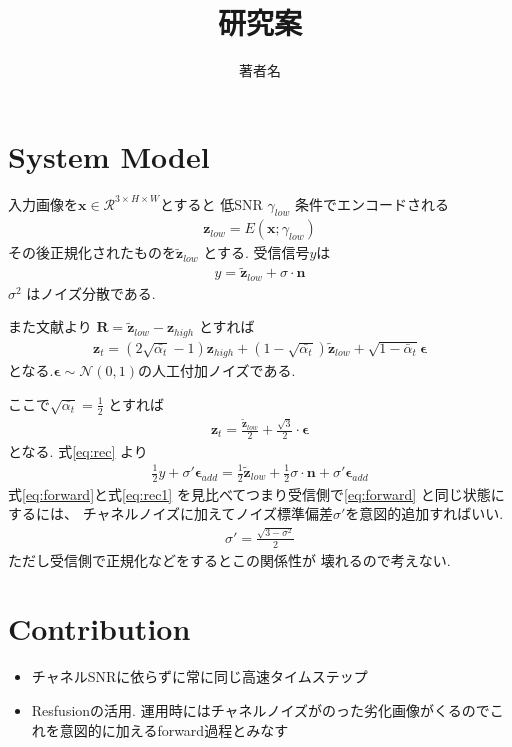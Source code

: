 \documentclass[a4paper,10pt,twocolumn]{ltjsarticle}
\title{
研究案
}
\author{
著者名
}
\date{}
\begin{document}
\maketitle

\section{System Model}

入力画像を$\mathbf{x} \in \mathcal{R}^{3\times H \times W}$とすると
低SNR $\gamma_{low}$ 条件でエンコードされる
\begin{align}
  \bm{z}_{low} = E(\mathbf{x};\gamma_{low})
\end{align}
その後正規化されたものを$\tilde{\bm{z}}_{low}$
とする.
受信信号$y$は
\begin{align}
  y = \tilde{\bm{z}}_{low} + \sigma \cdot \bm{n}
  \label{eq:rec}
\end{align}
$\sigma^2$ はノイズ分散である.

また文献\cite{shi2024resfusion}より
$\bm{R} = \tilde{\bm{z}}_{low} - \bm{z}_{high}$
とすれば
\begin{align}
  \bm{z}_t = (2\sqrt{\bar{\alpha_t}} -  1)\bm{z}_{high} + (1 - \sqrt{\bar{\alpha_t}})\tilde{\bm{z}}_{low} + \sqrt{1 - \bar{\alpha}_t} \bm{\epsilon} 
\end{align}
となる.$\bm{\epsilon} \sim \mathcal{N}(0, 1)$の人工付加ノイズである.

ここで$\sqrt{\bar{\alpha_t}} = \frac{1}{2}$
とすれば
\begin{align}
  \bm{z}_t =  \frac{\tilde{\bm{z}}_{low}}{2} + \frac{\sqrt{3}}{2} \cdot \bm{\epsilon} 
  \label{eq:forward}
\end{align}
となる.
式\eqref{eq:rec}
より
\begin{align}
  \frac{1}{2}y + \sigma'\bm{\epsilon}_{add}  = \frac{1}{2}\tilde{\bm{z}}_{low} + \frac{1}{2}\sigma \cdot \bm{n} +\sigma'\bm{\epsilon}_{add} 
  \label{eq:rec1}
\end{align}
式\eqref{eq:forward}と式\eqref{eq:rec1}
を見比べてつまり受信側で\eqref{eq:forward}
と同じ状態にするには、
チャネルノイズに加えてノイズ標準偏差$\sigma'$を意図的追加すればいい.
\begin{align}
  \sigma' = \frac{\sqrt{3 - \sigma^2}}{2}
\end{align}
ただし受信側で正規化などをするとこの関係性が
壊れるので考えない.
\section{Contribution}
\begin{itemize}
  \item チャネルSNRに依らずに常に同じ高速タイムステップ
  \item Resfusionの活用. 運用時にはチャネルノイズがのった劣化画像がくるのでこれを意図的に加えるforward過程とみなす
\end{itemize}
\end{document}
